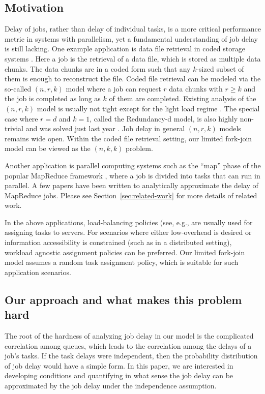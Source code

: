 \documentclass[sigconf]{acmart}
\begin{document}
\subsection*{\normalsize{Motivation}}
Delay of jobs, rather than delay of individual tasks, is a more critical performance metric in systems with parallelism, yet a fundamental understanding of job delay is still lacking.  One example application is data file retrieval in coded storage systems \cite{JosLiuSol_12,ShaLeeRam_13,LiRamSri_16,LeeShaHua_17,ShaBouBac_17}.  Here a job is the retrieval of a data file, which is stored as multiple data chunks.  The data chunks are in a coded form such that any $k$-sized subset of them is enough to reconstruct the file.  Coded file retrieval can be modeled via the so-called $(n,r,k)$ model \cite{ShaLeeRam_13} where a job can request $r$ data chunks with $r\ge k$ and the job is completed as long as $k$ of them are completed.  Existing analysis of the $(n,r,k)$ model is usually not tight except for the light load regime \cite{JosLiuSol_12,LiRamSri_16}. The special case where $r=d$ and $k=1$, called the Redundancy-d model, is also highly non-trivial and was solved just last year \cite{GarHarSch_17}. Job delay in general $(n,r,k)$ models remains wide open.  Within the coded file retrieval setting, our limited fork-join model can be viewed as the $(n,k,k)$ problem.


Another application is parallel computing systems such as the ``map'' phase of the popular MapReduce framework \cite{DeaGhe_04}, where a job is divided into tasks that can run in parallel. A few papers have been written to analytically approximate the delay of MapReduce jobs. Please see Section~\ref{sec:related-work} for more details of related work.


In the above applications, load-balancing policies (see, e.g., \cite{YinSriKan_15,XiaLanAgg_16,LiRamSri_16,LeeShaHua_17,ShaBouBac_17} are usually used for assigning tasks to servers. For scenarios where either low-overhead is desired or information accessibility is constrained (such as in a distributed setting), workload agnostic assignment policies \cite{XiaLanAgg_16,LeeShaHua_17,ShaBouBac_17} can be preferred.  Our limited fork-join model assumes a random task assignment policy, which is suitable for such application scenarios.

\subsection*{\normalsize{Our approach and what makes this problem hard}}
The root of the hardness of analyzing job delay in our model is the complicated correlation among queues, which leads to the correlation among the delays of a job's tasks.  If the task delays were independent, then the probability distribution of job delay would have a simple form.  In this paper, we are interested in developing conditions and quantifying in what sense the job delay can be approximated by the job delay under the independence assumption.
\end{document}
